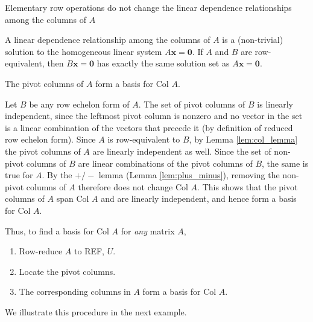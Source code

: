 \documentclass[12pt,letterpaper,reqno]{article}
\numberwithin{equation}{section}
\newcommand{\bx}{\mathbf{x}}
\newcommand{\Col}{\text{Col }}
\begin{document}
\begin{lem}\label{lem:col_lemma}
Elementary row operations do not change the linear dependence relationships among the columns of $A$
\end{lem}

\begin{pf}
A linear dependence relationship among the columns of $A$ is a (non-trivial) solution to the homogeneous linear system $A\bx=\mathbf{0}$. If $A$ and $B$ are row-equivalent, then $B\bx=\mathbf{0}$ has exactly the same solution set as $A\bx=\mathbf{0}$.
\end{pf}

\begin{thm}[Basis for $\Col A$]\label{thm:pivot_columns_form_basis_col_a}
	The pivot columns of $A$ form a basis for $\Col A$.
\end{thm}

\begin{pf}
Let $B$ be any row echelon form of $A$. The set of pivot columns of $B$ is linearly independent, since the leftmost pivot column is nonzero and no vector in the set is a linear combination of the vectors that precede it (by definition of reduced row echelon form). Since $A$ is row-equivalent to $B$, by Lemma \ref{lem:col_lemma} the pivot columns of $A$ are linearly independent as well. Since the set of non-pivot columns of $B$ are linear combinations of the pivot columns of $B$, the same is true for $A$. By the $+/-$ lemma (Lemma \ref{lem:plus_minus}), removing the non-pivot columns of $A$ therefore does not change $\Col A$. This shows that the pivot columns of $A$ span $\Col A$ and are linearly independent, and hence form a basis for $\Col A$.
\end{pf}

Thus, to find a basis for $\Col A$ for \emph{any} matrix $A$,
\begin{enumerate}
	\item Row-reduce $A$ to REF, $U$. 
	\item Locate the pivot columns.
	\item The corresponding columns in $A$ form a basis for $\Col A$.
\end{enumerate}
We illustrate this procedure in the next example.
\end{document}

